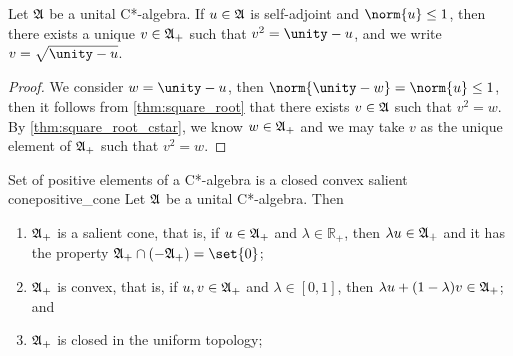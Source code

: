 \begin{corollary}
    Let \(\mathfrak{A}\) be a unital C*-algebra. If \(u \in \mathfrak{A}\) is self-adjoint and \(\norm{u} \leq 1\), then there exists a unique \(v \in \mathfrak{A}_+\) such that \(v^2 = \unity - u\), and we write \(v = \sqrt{\unity - u}\).
\end{corollary}
\begin{proof}
    We consider \(w = \unity - u\), then \(\norm{\unity - w} = \norm{u} \leq 1\), then it follows from \cref{thm:square_root} that there exists \(v \in \mathfrak{A}\) such that \(v^2 = w\). By \cref{thm:square_root_cstar}, we know \(w \in \mathfrak{A}_+\) and we may take \(v\) as the unique element of \(\mathfrak{A}_+\) such that \(v^2 = w\).
\end{proof}


\begin{theorem}{Set of positive elements of a C*-algebra is a closed convex salient cone}{positive_cone}
    Let \(\mathfrak{A}\) be a unital C*-algebra. Then
    \begin{enumerate}[label=(\alph*)]
        \item \(\mathfrak{A}_+\) is a salient cone, that is, if \(u \in \mathfrak{A}_+\) and \(\lambda \in \mathbb{R}_+\), then \(\lambda u \in \mathfrak{A}_+\) and it has the property \(\algebra{A}_+ \cap (-\algebra{A}_+) = \set{0}\);
        \item \(\mathfrak{A}_+\) is convex, that is, if \(u, v \in \mathfrak{A}_+\) and \(\lambda \in [0,1]\), then \(\lambda u + (1 - \lambda)v \in \mathfrak{A}_+\); and
        \item \(\mathfrak{A}_+\) is closed in the uniform topology;
    \end{enumerate}
\end{theorem}
